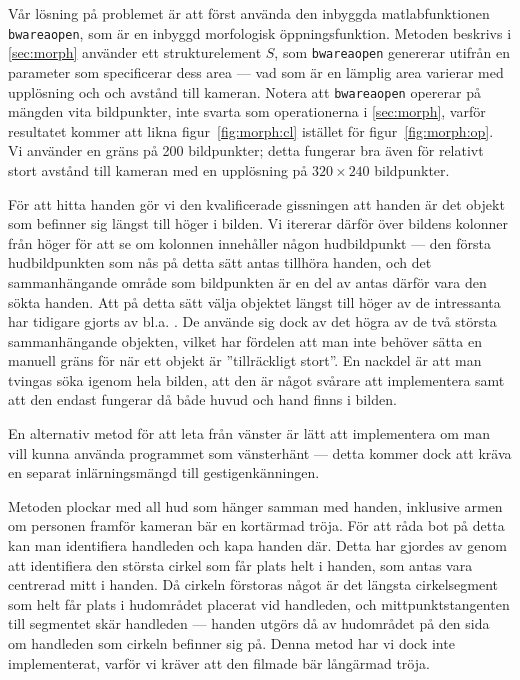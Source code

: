 Vår lösning på problemet är att först använda den inbyggda
matlabfunktionen \texttt{bwareaopen}, som är en inbyggd morfologisk
öppningsfunktion. Metoden beskrivs i
\ref{sec:morph} använder ett strukturelement $S$, som \texttt{bwareaopen}
genererar utifrån en parameter som specificerar
dess area --- vad som är en lämplig area
varierar med upplösning och
och avstånd till kameran. Notera att \texttt{bwareaopen} opererar på mängden
vita bildpunkter, inte svarta som operationerna i \ref{sec:morph}, varför
resultatet kommer att likna figur~\ref{fig:morph:cl} istället för
figur~\ref{fig:morph:op}.  Vi använder en gräns på 200
bildpunkter; detta fungerar bra även för relativt stort avstånd till
kameran med en upplösning på $320\times240$ bildpunkter.

För att hitta handen gör vi den kvalificerade gissningen att handen är det
objekt som befinner sig längst till höger i bilden.
Vi itererar därför över bildens kolonner från
höger för att se om kolonnen innehåller någon hudbildpunkt --- den första
hudbildpunkten som nås på detta sätt antas tillhöra handen, och det
sammanhängande område som bildpunkten är en del av antas därför vara den sökta
handen. Att på detta sätt välja objektet längst till höger av de
intressanta har tidigare gjorts av bl.a. . De använde
sig dock av det högra av de två största sammanhängande objekten,
vilket har fördelen att man inte behöver sätta en manuell gräns för
när ett objekt är ''tillräckligt stort''. En nackdel är att man tvingas
söka igenom hela bilden, att den är något svårare att
implementera samt att den endast fungerar då både huvud och hand finns
i bilden.

En alternativ metod för att leta från
vänster är lätt att implementera om man vill kunna använda programmet
som vänsterhänt --- detta kommer dock att kräva en
separat inlärningsmängd till gestigenkänningen. 

Metoden plockar med all hud som hänger samman med
handen, inklusive armen om personen framför kameran bär en kortärmad tröja. 
För att
råda bot på detta kan man identifiera handleden och kapa handen
där. Detta har gjordes av  genom att identifiera den 
största cirkel
som får plats helt i handen, som antas vara centrerad mitt i handen. Då
cirkeln förstoras något är det längsta cirkelsegment som helt får
plats i hudområdet placerat vid handleden, och mittpunktstangenten
till segmentet skär handleden --- handen utgörs då av hudområdet på den
sida om handleden som cirkeln befinner sig på. Denna metod har vi dock
inte implementerat, varför vi kräver att den filmade bär
långärmad tröja. 
